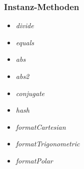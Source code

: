 \documentclass{beamer}
\begin{document}
\begin{frame}
\frametitle{Instanz-Methoden}

\begin{itemize}
\item \textit{divide}
\item \textit{equals}
\item \textit{abs}
\item \textit{abs2}
\item \textit{conjugate}
\item \textit{hash}
\item \textit{formatCartesian}
\item \textit{formatTrigonometric}
\item \textit{formatPolar}
\end{itemize}

\end{frame}
\end{document}
